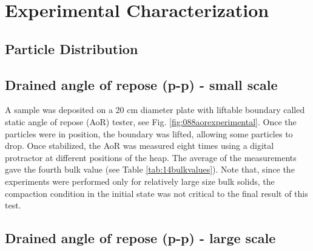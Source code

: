 
\chapter[Experimental Characterization]{Experimental Characterization}
\label{cap:experimentalcharacterization}







\section{Particle Distribution}
\label{sec:particledistribution}


\section{Drained angle of repose (p-p) - small scale}
\label{sec:aor}

A sample was deposited on a 20 cm diameter plate with liftable
boundary called static angle of repose (\acs{AoR}) tester, see Fig. \ref{fig:088aorexperimental}.
Once the particles were in position, the boundary was lifted, allowing some particles to drop. 
Once stabilized, the \acs{AoR} was measured eight times using a digital protractor at different positions of the heap. 
The average of the measurements gave the fourth bulk value (see Table
\ref{tab:14bulkvalues}).
Note that, since the experiments were performed only for relatively large size
bulk solids, the compaction condition in the initial state was not critical to the
final result of this test.\\


\section{Drained angle of repose (p-p) - large scale}
\label{sec:aorlargescale}

